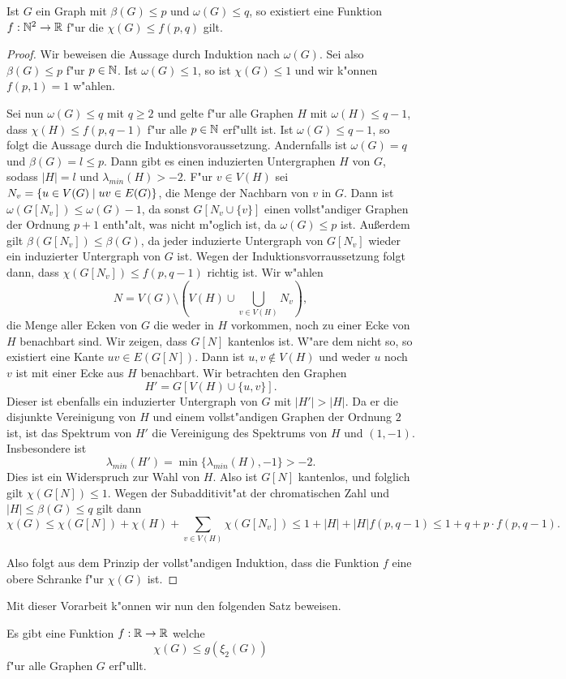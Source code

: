 \begin{lemma}
  Ist $G$ ein Graph mit $\beta(G) \leq p$ und $\omega(G) \leq q$, so existiert eine Funktion $f:{\mathbb{N}} ^{2} \to {\mathbb{R}}$ f"ur die $\chi(G) \leq f(p,q) $ gilt. 
  \label{lem:funktionxilemma}
\end{lemma}
\begin{proof}
  Wir beweisen die Aussage durch Induktion nach $\omega(G)$. Sei also $\beta(G) \leq p$ f"ur $p\in {\mathbb{N}}$. Ist $\omega(G) \leq 1$, so ist $\chi(G) \leq 1$ und wir k"onnen $f(p,1) = 1$ w"ahlen.
  
  Sei nun $\omega(G) \leq q$ mit $q \geq 2$ und gelte f"ur alle Graphen $H$ mit $\omega(H) \leq q-1$, dass $\chi(H) \leq f(p,q-1)$ f"ur alle $p \in {\mathbb{N}}$ erf"ullt ist.
  Ist $\omega(G) \leq q-1$, so folgt die Aussage durch die Induktionsvoraussetzung. Andernfalls ist $\omega(G) = q$ und $\beta(G) = l \leq p$. Dann gibt es einen induzierten Untergraphen $H$ von $G$, sodass $|H|=l$ und $\lambda_{min}(H)> -2$. F"ur $v\in V(H)$ sei $N_v = \{u\in V(G) \;|\; uv\in E(G) \}$, die Menge der Nachbarn von
  $v$ in $G$. Dann ist $\omega(G[N_v]) \leq \omega(G) -1 $, da sonst $G[N_v\cup \{v\}]$ einen vollst"andiger Graphen der Ordnung $p+1$ enth"alt, was nicht m"oglich ist, da $\omega(G) \leq p$ ist. Au{\ss}erdem gilt $\beta(G[N_v]) \leq \beta(G)$, da jeder induzierte Untergraph von $G[N_v]$ wieder ein induzierter Untergraph von $G$ ist. Wegen der Induktionsvorraussetzung folgt dann, dass $\chi(G[N_v]) \leq f(p,q-1)$ richtig ist. 
  Wir w"ahlen $$N = V(G) \setminus (V(H) \cup \bigcup\limits_{v\in V(H)} N_v ),$$ die Menge aller Ecken von $G$ die weder in $H$ vorkommen, noch zu einer Ecke von $H$ benachbart sind. Wir zeigen, dass $G[N]$ kantenlos ist. W"are dem nicht so, so existiert eine Kante $uv\in E(G[N])$. 
  Dann ist $u,v\notin V(H)$ und weder $u$ noch $v$ ist mit einer Ecke aus $H$ benachbart. Wir betrachten den Graphen $$H' = G[V(H) \cup \{u,v\}].$$ Dieser ist ebenfalls ein induzierter Untergraph von $G$ mit $|H'| > |H|$. Da er die disjunkte Vereinigung von $H$ und einem vollst"andigen Graphen der Ordnung $2$ ist, ist das Spektrum von $H'$ die Vereinigung des Spektrums von $H$ und $(1,-1)$. Insbesondere ist $$\lambda_{min}(H') = \min \{\lambda_{min}(H), -1\} > -2.$$ 
  Dies ist ein Widerspruch zur Wahl von $H$. Also ist $G[N]$ kantenlos, und folglich gilt $\chi(G[N]) \leq 1$. 
  Wegen der Subadditivit"at der chromatischen Zahl und $|H| \leq \beta(G) \leq q$ gilt dann $$\chi(G) \leq \chi(G[N]) + \chi(H) + \sum\limits_{v\in V(H)}\chi(G[N_v]) \leq 1 + |H| + |H|f(p,q-1)  \leq 1+q+p\cdot f(p,q-1).$$

Also folgt aus dem Prinzip der vollst"andigen Induktion, dass die Funktion $f$ eine obere Schranke f"ur $\chi(G)$ ist.
\end{proof}
Mit dieser Vorarbeit k"onnen wir nun den folgenden Satz beweisen.
\begin{theorem}
  Es gibt eine Funktion $f:{\mathbb{R}} \to {\mathbb{R}}$ welche $$\chi(G) \leq g(\xi_{2}(G))$$ f"ur alle Graphen $G$ erf"ullt. 
  \label{thm:funktionxi}
\end{theorem}

